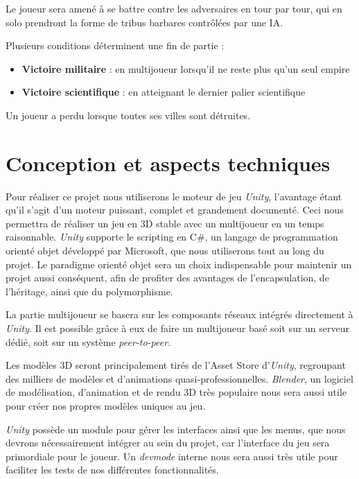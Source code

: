 \documentclass[12pt]{report}
\begin{document}
Le joueur sera amené à se battre contre les adversaires en tour par tour, qui en solo prendront la forme de tribus barbares contrôlées par une IA.

Plusieurs conditions déterminent une fin de partie :

\begin{itemize}[label=\textbullet]
    \item \textbf{Victoire militaire} : en multijoueur lorsqu’il ne reste plus qu’un seul empire
    \item \textbf{Victoire scientifique} : en atteignant le dernier palier scientifique
\end{itemize}

Un joueur a perdu lorsque toutes ses villes sont détruites.

\chapter{Conception et aspects techniques}

Pour réaliser ce projet nous utiliserons le moteur de jeu \textit{Unity}, l'avantage étant qu’il s’agit d’un moteur puissant, complet et grandement documenté. Ceci nous permettra de réaliser un jeu en 3D stable avec un multijoueur en un temps raisonnable. \textit{Unity} supporte le scripting en C\#, un langage de programmation orienté objet développé par Microsoft, que nous utiliserons tout au long du projet. Le paradigme orienté objet sera un choix indispensable pour maintenir un projet aussi conséquent, afin de profiter des avantages de l’encapsulation, de l’héritage, ainsi que du polymorphisme.

La partie multijoueur se basera sur les composants réseaux intégrés directement à \textit{Unity}. Il est possible grâce à eux de faire un multijoueur basé soit sur un serveur dédié, soit sur un système \textit{peer-to-peer}.

Les modèles 3D seront principalement tirés de l’Asset Store d’\textit{Unity}, regroupant des milliers de modèles et d’animations quasi-professionnelles. \textit{Blender}, un logiciel de modélisation, d’animation et de rendu 3D très populaire nous sera aussi utile pour créer nos propres modèles uniques au jeu.

\textit{Unity} possède un module pour gérer les interfaces ainsi que les menus, que nous devrons nécessairement intégrer au sein du projet, car l’interface du jeu sera primordiale pour le joueur. Un \textit{devmode} interne nous sera aussi très utile pour faciliter les tests de nos différentes fonctionnalités.
\end{document}

